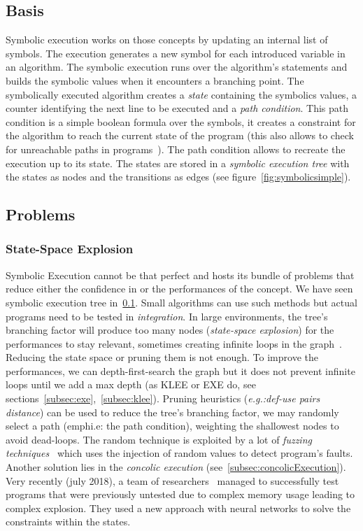 \documentclass[11pt]{IEEEtran}
\begin{document}
    \subsection{Basis}
      \label{sub:basis}
      Symbolic execution works on those concepts by updating an internal list of symbols. The execution generates a new symbol for each introduced variable in an algorithm\cite{newapproach}. The symbolic execution runs over the algorithm's statements and builds the symbolic values when it encounters a branching point. The symbolically executed algorithm creates a \emph{state}\cite{visserWillemCorina} containing the symbolics values, a counter identifying the next line to be executed and a \emph{path condition}. This path condition is a simple boolean formula over the symbols, it creates a constraint for the algorithm to reach the current state of the program (this also allows to check for unreachable paths in programs~\cite{InfeasiblePathsEliminationWithSymbolicExecTechniques}). The path condition allows to recreate the execution up to its state. The states are stored in a \emph{symbolic execution tree} with the states as nodes and the transitions as edges (see figure~\ref{fig:symbolicsimple}).
    \subsection{Problems}
      \label{sec:problems}
      \subsubsection{State-Space Explosion}
        \label{subsec:state-space-explosion}
        Symbolic Execution cannot be that perfect and hosts its bundle of problems that reduce either the confidence in or the performances of the concept. We have seen symbolic execution tree in~\ref{sub:basis}. Small algorithms can use such methods but actual programs need to be tested in \emph{integration}. In large environments, the tree's branching factor will produce too many nodes (\emph{state-space explosion}) for the performances to stay relevant, sometimes creating infinite loops in the graph~\cite{forwardSymbolicExecution}. Reducing the state space or pruning them is not enough. To improve the performances, we can depth-first-search the graph but it does not prevent infinite loops until we add a max depth (as KLEE or EXE do, see sections~\ref{subsec:exe},~\ref{subsec:klee}).
        Pruning heuristics (\emph{e.g.:def-use pairs distance}) can be used to reduce the tree's branching factor, we may randomly select a path (emph{i.e: the path condition}), weighting the shallowest nodes to avoid dead-loops. The random technique is exploited by a lot of \emph{fuzzing techniques}~\cite{CHEN2018118} which uses the injection of random values to detect program's faults. Another solution lies in the \emph{concolic execution} (see~\ref{subsec:concolicExecution}). Very recently (july 2018), a team of researchers~\cite{neurosymbolicexecution} managed to successfully test programs that were previously untested due to complex memory usage leading to complex explosion. They used a new approach with neural networks to solve the constraints within the states.
\end{document}
